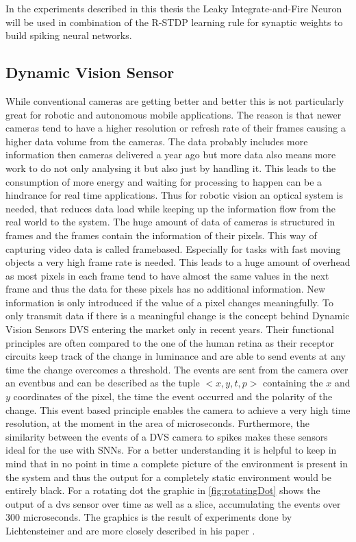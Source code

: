 In the experiments described in this thesis the Leaky Integrate-and-Fire Neuron will be used in combination of the R-STDP learning rule for synaptic weights to build spiking neural networks.

\subsection{Dynamic Vision Sensor}
While conventional cameras are getting better and better this is not particularly great for robotic and autonomous mobile applications. The reason is that newer cameras tend to have a higher resolution or refresh rate of their frames causing a higher data volume from the cameras. The data probably includes more information then cameras delivered a year ago but more data also means more work to do not only analysing it but also just by handling it. This leads to the consumption of more energy and waiting for processing to happen can be a hindrance for real time applications. Thus for robotic vision an optical system is needed, that reduces data load while keeping up the information flow from the real world to the system. The huge amount of data of cameras is structured in frames and the frames contain the information of their pixels. This way of capturing video data is called framebased. 
Especially for tasks with fast moving objects a very high frame rate is needed. This leads to a huge amount of overhead as most pixels in each frame tend to have almost the same values in the next frame and thus the data for these pixels has no additional information. New information is only introduced if the value of a pixel changes meaningfully.
\newline
To only transmit data if there is a meaningful change is the concept behind Dynamic Vision Sensors DVS entering the market only in recent years. Their functional principles are often compared to the one of the human retina as their receptor circuits keep track of the change in luminance and are able to send events at any time the change overcomes a threshold. The events are sent from the camera over an eventbus and can be described as the tuple $<x,y,t,p>$ containing the $x$ and $y$ coordinates of the pixel, the time the event occurred and the polarity of the change. This event based principle enables the camera to achieve a very high time resolution, at the moment in the area of microseconds. Furthermore, the similarity between the events of a DVS camera to spikes makes these sensors ideal for the use with SNNs.
For a better understanding it is helpful to keep in mind that in no point in time a complete picture of the environment is present in the system and thus the output for a completely static environment would be entirely black. For a rotating dot the graphic in \autoref{fig:rotatingDot} shows the output of a dvs sensor over time as well as a slice, accumulating the events over 300 microseconds. The graphics is the result of experiments done by Lichtensteiner and are more closely described in his paper \cite{lichtsteiner2008128}.

